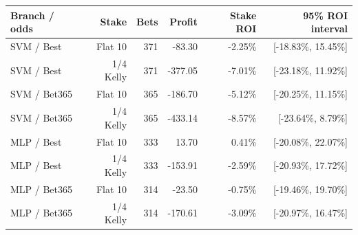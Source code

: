 \begin{tabularx}{\linewidth}{@{}Yrrrrr@{}}
\toprule
Branch / odds & Stake & Bets & Profit & Stake ROI & 95\% ROI interval \\

\midrule
SVM / Best & Flat 10 & 371 & -83.30 & -2.25\% & [-18.83\%, 15.45\%] \\
SVM / Best & 1/4 Kelly & 371 & -377.05 & -7.01\% & [-23.18\%, 11.92\%] \\
SVM / Bet365 & Flat 10 & 365 & -186.70 & -5.12\% & [-20.25\%, 11.15\%] \\
SVM / Bet365 & 1/4 Kelly & 365 & -433.14 & -8.57\% & [-23.64\%, 8.79\%] \\
MLP / Best & Flat 10 & 333 & 13.70 & 0.41\% & [-20.08\%, 22.07\%] \\
MLP / Best & 1/4 Kelly & 333 & -153.91 & -2.59\% & [-20.93\%, 17.72\%] \\
MLP / Bet365 & Flat 10 & 314 & -23.50 & -0.75\% & [-19.46\%, 19.70\%] \\
MLP / Bet365 & 1/4 Kelly & 314 & -170.61 & -3.09\% & [-20.97\%, 16.47\%] \\
\bottomrule
\end{tabularx}
